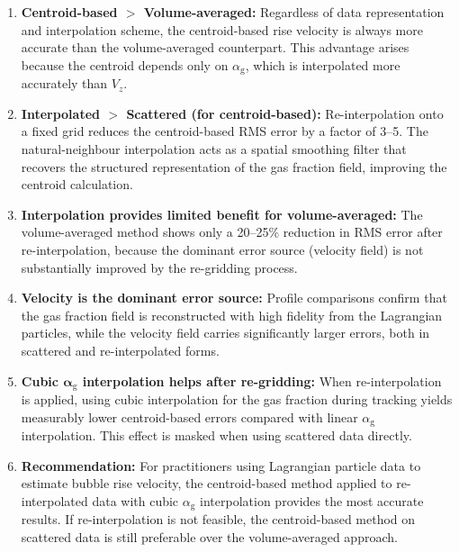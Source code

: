 \documentclass[11pt,a4paper]{article}
\newcommand{\alphag}{\alpha_{\mathrm{g}}}
\newcommand{\Vz}{V_z}
\begin{document}
\begin{enumerate}[label=(\roman*)]
  \item \textbf{Centroid-based $\boldsymbol{>}$ Volume-averaged:}
    Regardless of data representation and interpolation scheme, the
    centroid-based rise velocity is always more accurate than the
    volume-averaged counterpart.  This advantage arises because the
    centroid depends only on $\alphag$, which is interpolated more
    accurately than $\Vz$.

  \item \textbf{Interpolated $\boldsymbol{>}$ Scattered (for
    centroid-based):} Re-interpolation onto a fixed grid reduces the
    centroid-based RMS error by a factor of 3--5.  The natural-neighbour
    interpolation acts as a spatial smoothing filter that recovers the
    structured representation of the gas fraction field, improving the
    centroid calculation.

  \item \textbf{Interpolation provides limited benefit for volume-averaged:}
    The volume-averaged method shows only a 20--25\% reduction in RMS error
    after re-interpolation, because the dominant error source (velocity field)
    is not substantially improved by the re-gridding process.

  \item \textbf{Velocity is the dominant error source:} Profile comparisons
    confirm that the gas fraction field is reconstructed with high fidelity
    from the Lagrangian particles, while the velocity field carries
    significantly larger errors, both in scattered and re-interpolated forms.

  \item \textbf{Cubic $\boldsymbol{\alphag}$ interpolation helps after
    re-gridding:}  When re-interpolation is applied, using cubic
    interpolation for the gas fraction during tracking yields measurably
    lower centroid-based errors compared with linear $\alphag$
    interpolation. This effect is masked when using scattered data directly.

  \item \textbf{Recommendation:} For practitioners using Lagrangian particle
    data to estimate bubble rise velocity, the centroid-based method applied
    to re-interpolated data with cubic $\alphag$ interpolation provides the
    most accurate results.  If re-interpolation is not feasible, the
    centroid-based method on scattered data is still preferable over the
    volume-averaged approach.
\end{enumerate}
\end{document}
